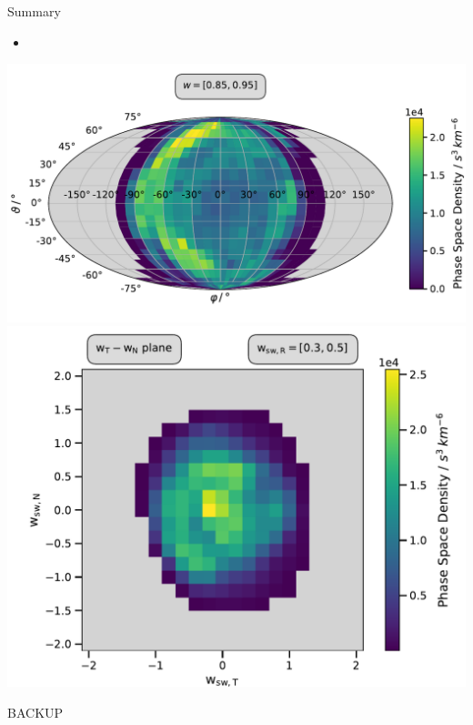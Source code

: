 \documentclass{beamer}
\begin{document}
\begin{frame}[plain]{Summary}
\begin{itemize}
	\item 
\end{itemize}
	\includegraphics[scale=.21]{Pics/sky_ps.pdf}
	\includegraphics[scale=.25]{Pics/cart_50_ps_R.pdf}
\end{frame}


\begin{frame}[plain]{}
\begin{center}
	{\Huge BACKUP}
\end{center}
\end{frame}
\end{document}
